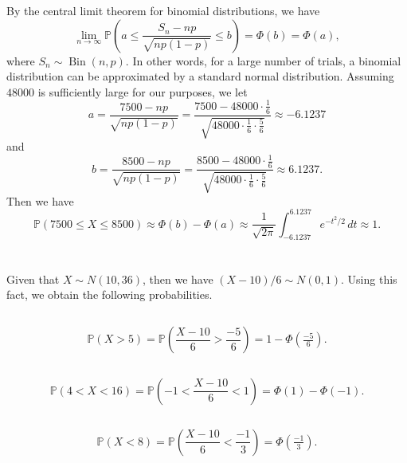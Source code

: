 \documentclass[12pt]{article}
\renewcommand{\P}{\mathbb{P}}
\newcommand{\Bin}{\operatorname{Bin}}
\begin{document}
By the central limit theorem for binomial distributions, we have
\[
    \lim_{n \to \infty} \P \left( a \leq \frac{S_n - np}{\sqrt{np(1-p)}} \leq b \right)
        = \Phi(b) = \Phi(a),
\]
where $S_n \sim \Bin(n,p)$. In other words, for a large number of trials, a binomial distribution can be approximated by a standard normal distribution. Assuming $48000$ is sufficiently large for our purposes, we let
\[
    a = \frac{7500 - np}{\sqrt{np(1-p)}} 
        = \frac{7500 - 48000 \cdot \frac16}{\sqrt{48000 \cdot \frac16 \cdot \frac56}} 
        \approx -6.1237
\]
and
\[
    b = \frac{8500 - np}{\sqrt{np(1-p)}} 
        = \frac{8500 - 48000 \cdot \frac16}{\sqrt{48000 \cdot \frac16 \cdot \frac56}} 
        \approx 6.1237.
\]
Then we have
\[
    \P(7500 \leq X \leq 8500)
        \approx \Phi(b) - \Phi(a)
        \approx \frac{1}{\sqrt{2\pi}}\int_{-6.1237}^{6.1237} e^{-t^2/2} \,dt 
        \approx 1.
\]


\newpage
\section{}

Given that $X \sim N(10, 36)$, then we have $(X - 10)/6 \sim N(0,1)$. Using this fact, we obtain the following probabilities.

\subsection{}

\[
    \P(X > 5) = \P\left( \frac{X - 10}{6} > \frac{-5}{6} \right) = 1 - \Phi(\tfrac{-5}{6}).
\]

\subsection{}

\[
    \P(4 < X < 16) = \P\left( -1 < \frac{X - 10}{6} < 1 \right) = \Phi(1) - \Phi(-1).
\]

\subsection{}

\[
    \P(X < 8) = \P\left(\frac{X - 10}{6} < \frac{-1}{3} \right) = \Phi(\tfrac{-1}{3}).
\]
\end{document}
